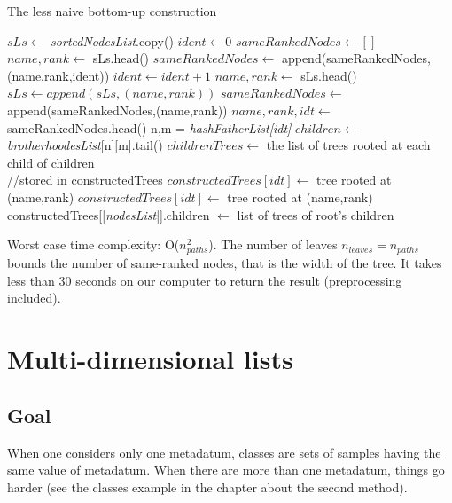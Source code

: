 \documentclass{report}
\begin{document}
\begin{algorithm}
\caption{The less naive bottom-up construction}
\begin{algorithmic}
\STATE $sLs \leftarrow $ \emph{sortedNodesList}.copy()
\STATE $ident \leftarrow 0$
\STATE $sameRankedNodes \leftarrow []$
\STATE $name,rank \leftarrow $ sLs.head()
\STATE $sameRankedNodes \leftarrow $ append(sameRankedNodes,(name,rank,ident))
\STATE $ident \leftarrow ident + 1$
\STATE $name,rank \leftarrow $ sLs.head()
\ENDIF
\ENDWHILE
\STATE $sLs \leftarrow append(sLs,(name,rank)) $
\STATE $sameRankedNodes \leftarrow $ append(sameRankedNodes,(name,rank))
\ENDIF
{}
\STATE $name,rank,idt \leftarrow $ sameRankedNodes.head()
\STATE n,m = \emph{hashFatherList[idt]}
\STATE $children \leftarrow $ \emph{brotherhoodesList}[n][m].tail()
\STATE $childrenTrees \leftarrow $ the list of trees rooted at each child of children \\
//stored in constructedTrees
\STATE $constructedTrees[idt] \leftarrow $ tree rooted at (name,rank) 
\ELSE
\STATE $constructedTrees[idt] \leftarrow $ tree rooted at (name,rank)
\ENDIF
\ENDWHILE
\ENDFOR
\STATE constructedTrees[|\emph{nodesList}|].children $ \leftarrow $ list of trees of root's children
\end{algorithmic}
\end{algorithm}

Worst case time complexity: O($n_{paths}^{2}$). The number of leaves $n_{leaves} = n_{paths}$ bounds the number of same-ranked nodes, that is the width of the tree. It takes less than $30$ seconds on our computer to return the result (preprocessing included).\\

\chapter{Multi-dimensional lists}

\section{Goal}

When one considers only one metadatum, classes are sets of samples having the same value of metadatum. When there are more than one metadatum, things go harder (see the classes example in the chapter about the second method).
\end{document}
